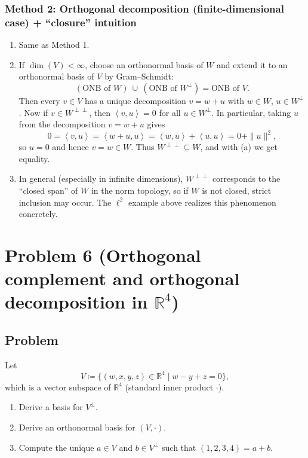 \documentclass[12pt]{article}
\newcommand{\df}{\coloneqq}
\newcommand{\R}{\mathbb{R}}
\newcommand{\ip}[2]{\left\langle #1,#2\right\rangle}
\begin{document}
\subsubsection{Method 2: Orthogonal decomposition (finite-dimensional case) + ``closure'' intuition}
\begin{enumerate}[label=(\alph*)]
\item Same as Method 1.

\item If $\dim(V)<\infty$, choose an orthonormal basis of $W$ and extend it to an orthonormal basis of $V$ by Gram--Schmidt:
\[
(\text{ONB of }W)\ \cup\ (\text{ONB of }W^\perp)=\text{ONB of }V.
\]
Then every $v\in V$ has a unique decomposition $v=w+u$ with $w\in W$, $u\in W^\perp$.
Now if $v\in W^{\perp\perp}$, then $\ip{v}{u}=0$ for all $u\in W^\perp$.
In particular, taking $u$ from the decomposition $v=w+u$ gives
\[
0=\ip{v}{u}=\ip{w+u}{u}=\ip{w}{u}+\ip{u}{u} = 0+\|u\|^2,
\]
so $u=0$ and hence $v=w\in W$. Thus $W^{\perp\perp}\subseteq W$, and with (a) we get equality.

\item In general (especially in infinite dimensions), $W^{\perp\perp}$ corresponds to the ``closed span'' of $W$ in the norm topology,
so if $W$ is not closed, strict inclusion may occur. The $\ell^2$ example above realizes this phenomenon concretely.
\end{enumerate}

\newpage
\section{Problem 6 (Orthogonal complement and orthogonal decomposition in $\R^4$)}
\subsection{Problem}
Let
\[
V\df \{(w,x,y,z)\in\R^4\mid w-y+z=0\},
\]
which is a vector subspace of $\R^4$ (standard inner product $\cdot$).
\begin{enumerate}[label=(\alph*)]
\item Derive a basis for $V^\perp$.
\item Derive an orthonormal basis for $(V,\cdot)$.
\item Compute the unique $a\in V$ and $b\in V^\perp$ such that $(1,2,3,4)=a+b$.
\end{enumerate}
\end{document}
